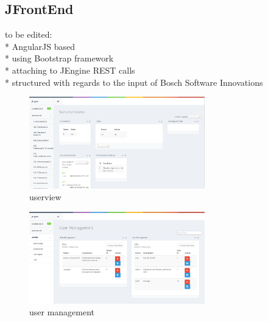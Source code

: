 %
%
\subsection{JFrontEnd}

to be edited: \\
* AngularJS based\\
* using Bootstrap framework\\
* attaching to JEngine REST calls\\
* structured with regards to the input of Bosch Software Innovations\\


\begin{figure}
\centering
\includegraphics[width=3in]{img/userview.png}
\caption{userview}
\label{fig:userview}
\end{figure}

\begin{figure}
\centering
\includegraphics[width=3in]{img/user_management.png}
\caption{user management}
\label{fig:user_management}
\end{figure}

